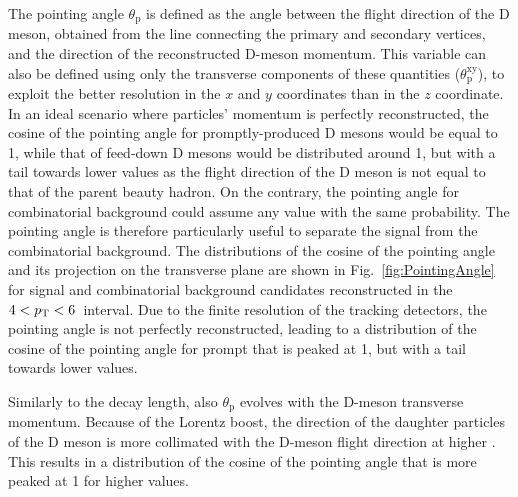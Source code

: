 The pointing angle $\theta_\mathrm{p}$ is defined as the angle between the flight direction of the D meson, obtained from the line connecting the primary and secondary vertices, and the direction of the reconstructed D-meson momentum. This variable can also be defined using only the transverse components of these quantities ($\theta_\mathrm{p}^{\mathrm{xy}}$), to exploit the better resolution in the $x$ and $y$ coordinates than in the $z$ coordinate. In an ideal scenario where particles' momentum is perfectly reconstructed, the cosine of the pointing angle for promptly-produced D mesons would be equal to 1, while that of feed-down D mesons would be distributed around 1, but with a tail towards lower values as the flight direction of the D meson is not equal to that of the parent beauty hadron. On the contrary, the pointing angle for combinatorial background could assume any value with the same probability. The pointing angle is therefore particularly useful to separate the signal from the combinatorial background. The distributions of the cosine of the pointing angle and its projection on the transverse plane are shown in Fig.~\ref{fig:PointingAngle} for signal and combinatorial background candidates reconstructed in the $4 < p_\mathrm{T} < 6$~\gevc interval. Due to the finite resolution of the tracking detectors, the pointing angle is not perfectly reconstructed, leading to a distribution of the cosine of the pointing angle for prompt \ds that is peaked at 1, but with a tail towards lower values.

Similarly to the decay length, also $\theta_\mathrm{p}$ evolves with the D-meson transverse momentum. Because of the Lorentz boost, the direction of the daughter particles of the D meson is more collimated with the D-meson flight direction at higher \pt. This results in a distribution of the cosine of the pointing angle that is more peaked at 1 for higher \pt values.

